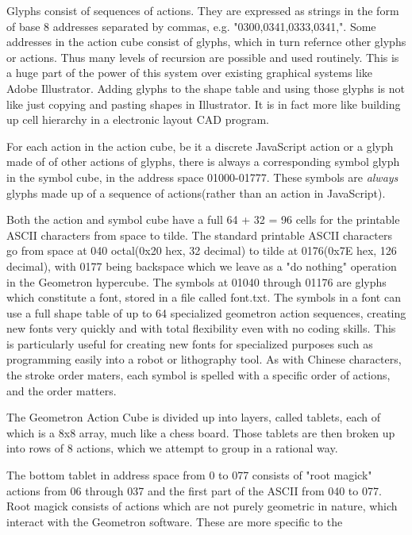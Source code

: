\documentclass[11pt]{article}
\begin{document}
    Glyphs consist of sequences of actions.  They are expressed as strings in the form of base 8 addresses separated by commas, e.g. "0300,0341,0333,0341,".  Some addresses in the action cube consist of glyphs, which in turn refernce other glyphs or actions.  Thus many levels of recursion are possible and used routinely.  This is a huge part of the power of this system over existing graphical systems like Adobe Illustrator.  Adding glyphs to the shape table and using those glyphs is not like just copying and pasting shapes in Illustrator.  It is in fact more like building up cell hierarchy in a electronic layout CAD program. 
    



    For each action in the action cube, be it a discrete JavaScript action or a glyph made of of other actions of glyphs, there is always a corresponding symbol glyph in the symbol cube, in the address space 01000-01777.  These symbols are \textit{
always} glyphs made up of a sequence of actions(rather than an action in JavaScript).  




    Both the action and symbol cube have a full 64 + 32 = 96 cells for the printable ASCII characters from space to tilde.  The standard printable ASCII characters go from space at 040 octal(0x20 hex, 32 decimal) to tilde at 0176(0x7E hex, 126 decimal), with 0177 being backspace which we leave as a "do nothing" operation in the Geometron hypercube. The symbols at 01040 through 01176 are glyphs which constitute a font, stored in a file called font.txt.  The symbols in a font can use a full shape table of up to 64 specialized geometron action sequences, creating new fonts very quickly and with total flexibility even with no coding skills.  This is particularly useful for creating new fonts for specialized purposes such as programming easily into a robot or lithography tool. As with Chinese characters, the stroke order maters, each symbol is spelled with a specific order of actions, and the order matters.   




    The Geometron Action Cube is divided up into layers, called tablets, each of which is a 8x8 array, much like a chess board.  Those tablets are then broken up into rows of 8 actions, which we attempt to group in a rational way.   




    The bottom tablet in address space from 0 to 077 consists of "root magick" actions from 06 through 037 and the first part of the ASCII from 040 to 077.  Root magick consists of actions which are not purely geometric in nature, which interact with the Geometron software.  These are more specific to the 
\end{document}
